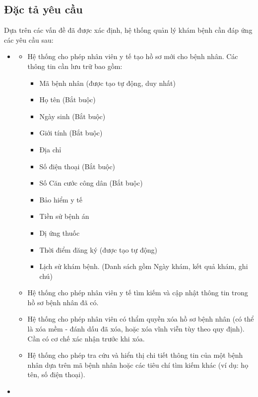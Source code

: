 \subsection{Đặc tả yêu cầu}
Dựa trên các vấn đề đã được xác định, hệ thống quản lý khám bệnh cần đáp ứng các yêu cầu sau:
\begin{itemize}
    \item {}
    \begin{itemize}
        \item {} Hệ thống cho phép nhân viên y tế tạo hồ sơ mới cho bệnh nhân. Các thông tin cần lưu trữ bao gồm:
        \begin{itemize}
            \item Mã bệnh nhân (được tạo tự động, duy nhất)
            \item Họ tên (Bắt buộc)
            \item Ngày sinh (Bắt buộc)
            \item Giới tính (Bắt buộc)
            \item Địa chỉ
            \item Số điện thoại (Bắt buộc)
            \item Số Căn cước công dân (Bắt buộc)
            \item Bảo hiểm y tế
            \item Tiền sử bệnh án
            \item Dị ứng thuốc
            \item Thời điểm đăng ký (được tạo tự động)
            \item Lịch sử khám bệnh. (Danh sách gồm Ngày khám, kết quả khám, ghi chú)
        \end{itemize}
        \item {} Hệ thống cho phép nhân viên y tế tìm kiếm và cập nhật thông tin trong hồ sơ bệnh nhân đã có.
        \item {} Hệ thống cho phép nhân viên có thẩm quyền xóa hồ sơ bệnh nhân (có thể là xóa mềm - đánh dấu đã xóa, hoặc xóa vĩnh viễn tùy theo quy định). Cần có cơ chế xác nhận trước khi xóa.
        \item {} Hệ thống cho phép tra cứu và hiển thị chi tiết thông tin của một bệnh nhân dựa trên mã bệnh nhân hoặc các tiêu chí tìm kiếm khác (ví dụ: họ tên, số điện thoại).
    \end{itemize}
    \item {}

\end{itemize}
